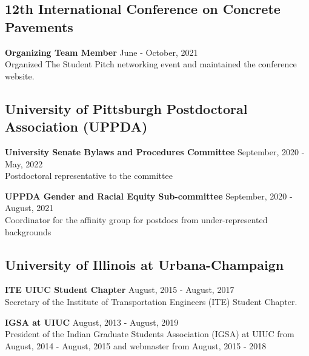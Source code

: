 \documentclass[12pt]{article}
\begin{document}
\subsection*{12th International Conference on Concrete Pavements}
\textbf{Organizing Team Member} \hfill June - October, 2021 \\
Organized The Student Pitch networking event and maintained the conference website. \\

\subsection*{University of Pittsburgh Postdoctoral Association (UPPDA)}
\textbf{University Senate Bylaws and Procedures Committee} \hfill September, 2020 - May, 2022 \\
Postdoctoral representative to the committee

\textbf{UPPDA Gender and Racial Equity Sub-committee} \hfill September, 2020 - August, 2021 \\
Coordinator for the affinity group for postdocs from under-represented backgrounds \\

\subsection*{University of Illinois at Urbana-Champaign} 
\textbf{ITE UIUC Student Chapter} \hfill August, 2015 - August, 2017 \\
Secretary of the Institute of Transportation Engineers (ITE) Student Chapter. 

\textbf{IGSA at UIUC} \hfill August, 2013 - August, 2019 \\
President of the Indian Graduate Students Association (IGSA) at UIUC from August, 2014 - August, 2015 and webmaster from August, 2015 - 2018 \\
\end{document}
